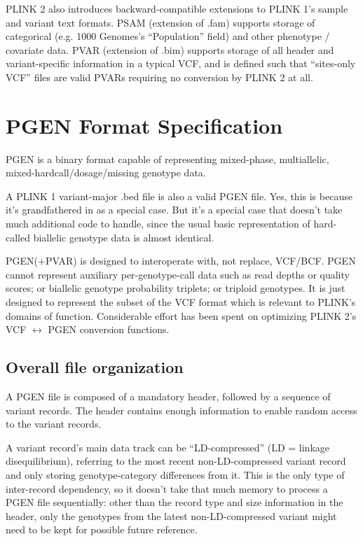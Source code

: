 \documentclass[8pt]{article}
\begin{document}
PLINK 2 also introduces backward-compatible extensions to PLINK 1's sample and
variant text formats.  PSAM (extension of .fam) supports storage of categorical
(e.g. 1000 Genomes's ``Population'' field) and other phenotype / covariate
data.  PVAR (extension of .bim) supports storage of all header and
variant-specific information in a typical VCF, and is defined such that
``sites-only VCF'' files are valid PVARs requiring no conversion by PLINK 2 at
all.

\section{PGEN Format Specification}

PGEN is a binary format capable of representing mixed-phase, multiallelic,
mixed-hardcall/dosage/missing genotype data.

A PLINK 1 variant-major .bed file is also a valid PGEN file.  Yes, this is
because it's grandfathered in as a special case.  But it's a special case that
doesn't take much additional code to handle, since the usual basic
representation of hard-called biallelic genotype data is almost identical.

PGEN(+PVAR) is designed to interoperate with, not replace, VCF/BCF.  PGEN
cannot represent auxiliary per-genotype-call data such as read depths or
quality scores; or biallelic genotype probability triplets; or triploid
genotypes.  It is just designed to represent the subset of the VCF format which
is relevant to PLINK's domains of function.  Considerable effort has been spent
on optimizing PLINK 2's VCF $\leftrightarrow$ PGEN conversion functions.

\subsection{Overall file organization}

A PGEN file is composed of a mandatory header, followed by a sequence of
variant records.  The header contains enough information to enable random
access to the variant records.

A variant record's main data track can be ``LD-compressed'' (LD = linkage
disequilibrium), referring to the most recent non-LD-compressed variant record
and only storing genotype-category differences from it.  This is the only type
of inter-record dependency, so it doesn't take that much memory to process a
PGEN file sequentially: other than the record type and size information in the
header, only the genotypes from the latest non-LD-compressed variant might need
to be kept for possible future reference.
\end{document}

